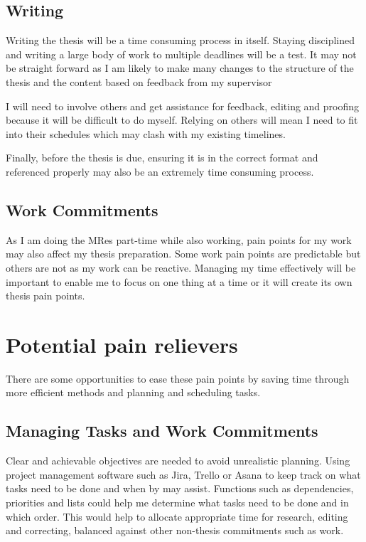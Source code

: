 \documentclass[a4paper]{article}
\begin{document}
\subsection*{Writing}
Writing the thesis will be a time consuming process in itself. Staying disciplined and writing a large body of work to multiple deadlines will be a test. It may not be straight forward as I am likely to make many changes to the structure of the thesis and the content based on feedback from my supervisor\par
I will need to involve others and get assistance for feedback, editing and proofing because it will be difficult to do myself. Relying on others will mean I need to fit into their schedules which may clash with my existing timelines.\par
Finally, before the thesis is due, ensuring it is in the correct format and referenced properly may also be an extremely time consuming process.\par
\subsection*{Work Commitments}
As I am doing the MRes part-time while also working, pain points for my work may also affect my thesis preparation. Some work pain points are predictable but others are not as my work can be reactive. Managing my time effectively will be important to enable me to focus on one thing at a time or it will create its own thesis pain points.

\section*{Potential pain relievers}

There are some opportunities to ease these pain points by saving time through more efficient methods and planning and scheduling tasks.\par
\subsection*{Managing Tasks and Work Commitments}
Clear and achievable objectives are needed to avoid unrealistic planning. Using project management software such as Jira, Trello or Asana to keep track on what tasks need to be done and when by may assist. Functions such as dependencies, priorities and lists could help me determine what tasks need to be done and in which order. This would help to allocate appropriate time for research, editing and correcting, balanced against other non-thesis commitments such as work.
\end{document}
